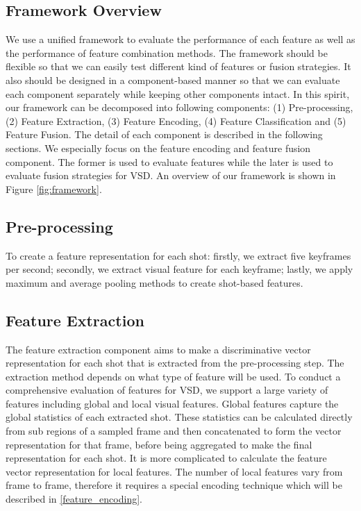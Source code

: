 \documentclass[review]{elsarticle}
\begin{document}
\subsection{Framework Overview}
We use a unified framework to evaluate the performance of each feature as well as the performance of feature combination methods. The framework should be flexible so that we can easily test different kind of features or fusion strategies. It also should be designed in a component-based manner so that we can evaluate each component separately while keeping other components intact. In this spirit, our framework can be decomposed into following components: (1) Pre-processing, (2) Feature Extraction, (3) Feature Encoding, (4) Feature Classification and (5) Feature Fusion. The detail of each component is described in the following sections. We especially focus on the feature encoding and feature fusion component. The former is used to evaluate features while the later is used to evaluate fusion strategies for VSD. An overview of our framework is shown in Figure \ref{fig:framework}.

\subsection{Pre-processing}
To create a feature representation for each shot: firstly, we extract five keyframes per second; secondly, we extract visual feature for each keyframe; lastly, we apply maximum and average pooling methods to create shot-based features.
\subsection{Feature Extraction}
The feature extraction component aims to make a discriminative vector representation for each shot that is extracted from the pre-processing step. The extraction method depends on what type of feature will be used. To conduct a comprehensive evaluation of features for VSD, we support a large variety of features including global and local visual features. Global features capture the global statistics of each extracted shot. These statistics can be calculated directly from sub regions of a sampled frame and then concatenated to form the vector representation for that frame, before being aggregated to make the final representation for each shot. It is more complicated to calculate the feature vector representation for local features. The number of local features vary from frame to frame, therefore it requires a special encoding technique which will be described in \ref{feature_encoding}.
\end{document}
